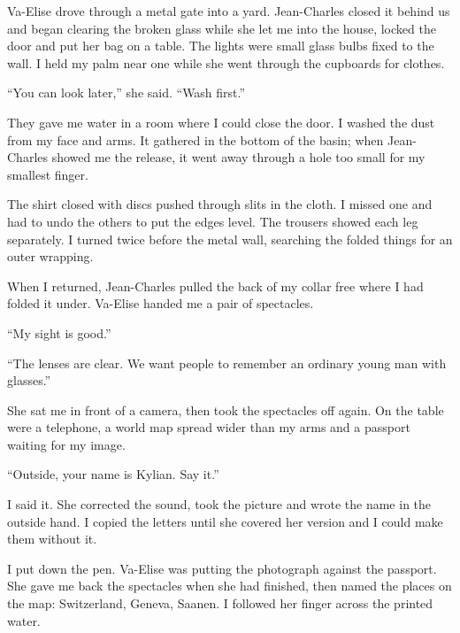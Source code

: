 Va-Elise drove through a metal gate into a yard. Jean-Charles closed it behind us and began clearing the broken glass while she let me into the house, locked the door and put her bag on a table. The lights were small glass bulbs fixed to the wall. I held my palm near one while she went through the cupboards for clothes.\par

``You can look later,'' she said. ``Wash first.''\par

They gave me water in a room where I could close the door. I washed the dust from my face and arms. It gathered in the bottom of the basin; when Jean-Charles showed me the release, it went away through a hole too small for my smallest finger.\par

The shirt closed with discs pushed through slits in the cloth. I missed one and had to undo the others to put the edges level. The trousers showed each leg separately. I turned twice before the metal wall, searching the folded things for an outer wrapping.\par

When I returned, Jean-Charles pulled the back of my collar free where I had folded it under. Va-Elise handed me a pair of spectacles.\par

``My sight is good.''\par

``The lenses are clear. We want people to remember an ordinary young man with glasses.''\par

She sat me in front of a camera, then took the spectacles off again. On the table were a telephone, a world map spread wider than my arms and a passport waiting for my image.\par

``Outside, your name is Kylian. Say it.''\par

I said it. She corrected the sound, took the picture and wrote the name in the outside hand. I copied the letters until she covered her version and I could make them without it.\par

I put down the pen. Va-Elise was putting the photograph against the passport. She gave me back the spectacles when she had finished, then named the places on the map: Switzerland, Geneva, Saanen. I followed her finger across the printed water.\par

